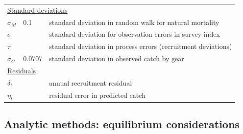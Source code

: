 \begin{center}
\begin{longtable}{lll}
\multicolumn{3}{l}{\underline{Standard deviations}}\\
$\sigma_M$          &0.1    & standard deviation in random walk for natural mortality\\
$\sigma$            &       & standard deviation for observation errors in survey index\\
$\tau$              &       & standard deviation in process errors (recruitment deviations)\\
$\sigma_C$          &0.0707 & standard deviation in observed catch by gear\\
\multicolumn{3}{l}{\underline{Residuals}}\\
$\delta_t$      &   & annual recruitment residual\\
$\eta_t$        &   & residual error in predicted catch\\


\end{longtable}
\end{center}


\subsection{Analytic methods: equilibrium considerations} %
\label{sub:analytic_methods_equilibrium_considerations}

